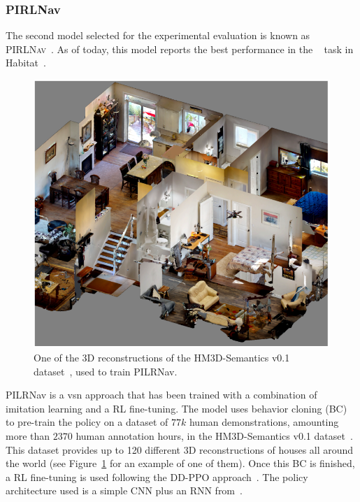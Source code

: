 \subsubsection{PIRLNav}
The second model selected for the experimental evaluation is known as \textsc{PIRLNav}~\cite{ramrakhya2023}.
As of today, this model reports the best performance in the \objnav~\cite{batra2020} task in Habitat~\cite{NEURIPS2021_021bbc7e}.

\begin{figure}[t]
    \centering
    \includegraphics[width=\linewidth]{figures/ros4vsn/dataset_scene}
    \caption{One of the 3D reconstructions of the HM3D-Semantics v0.1 dataset~\cite{Ramakrishnan2021HabitatMatterport3D}, used to train PILRNav.}
    \label{fig:scene_hm3d}
\end{figure}

PILRNav is a \acrshort{vsn} approach that has been trained with a combination of imitation learning and a RL fine-tuning.
The model uses behavior cloning (BC) to pre-train the \objnav policy on a dataset of $77k$ human demonstrations, amounting more than $2370$ human annotation hours, in the HM3D-Semantics v0.1 dataset~\cite{Ramakrishnan2021HabitatMatterport3D}.
This dataset provides up to 120 different 3D reconstructions of houses all around the world (see Figure~\ref{fig:scene_hm3d} for an example of one of them).
Once this BC is finished, a RL fine-tuning is used following the DD-PPO approach~\cite{Wijmans2019DDPPOLN}.
The policy architecture used is a simple CNN plus an RNN from~\cite{yadav2022}.

